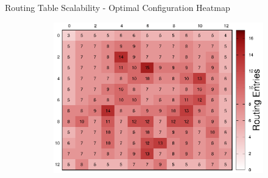 \begin{frame}{Routing Table Scalability - Optimal Configuration Heatmap}
\begin{center}
\begin{figure}
\begin{subfigure}{0.45\linewidth}
				\includegraphics[width=1.0\linewidth]{charts/nasa/nasa-routing-tables-heatmap-sla-off-optimal.eps}
			\end{subfigure}
		\end{figure}
	\end{center}
\end{frame}

